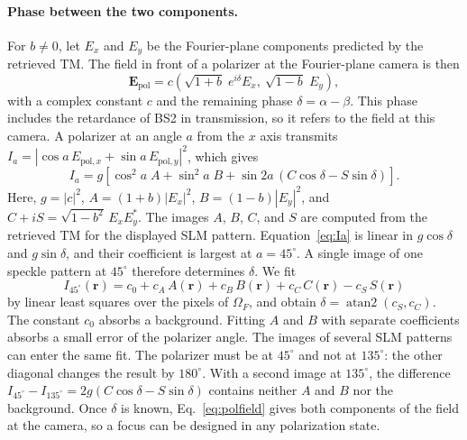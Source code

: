 \documentclass{article}
\begin{document}
\paragraph{Phase between the two components.}
For $b\neq0$, let $E_x$ and $E_y$ be the Fourier-plane components predicted by the retrieved TM.
The field in front of a polarizer at the Fourier-plane camera is then
\begin{equation}
\label{eq:polfield}
\mathbf{E}_{\mathrm{pol}}=c\left(\sqrt{1+b}\;e^{i\delta}E_x,\ \sqrt{1-b}\;E_y\right),
\end{equation}
with a complex constant $c$ and the remaining phase $\delta=\alpha-\beta$.
This phase includes the retardance of BS2 in transmission, so it refers to the field at this camera.
A polarizer at an angle $a$ from the $x$ axis transmits $I_a=|\cos a\,E_{\mathrm{pol},x}+\sin a\,E_{\mathrm{pol},y}|^2$, which gives
\begin{equation}
\label{eq:Ia}
I_a=g\left[\cos^2\!a\;A+\sin^2\!a\;B+\sin2a\,\left(C\cos\delta-S\sin\delta\right)\right].
\end{equation}
Here, $g=|c|^2$, $A=(1+b)|E_x|^2$, $B=(1-b)|E_y|^2$, and $C+iS=\sqrt{1-b^2}\,E_xE_y^{*}$.
The images $A$, $B$, $C$, and $S$ are computed from the retrieved TM for the displayed SLM pattern.
Equation~\eqref{eq:Ia} is linear in $g\cos\delta$ and $g\sin\delta$, and their coefficient is largest at $a=45^\circ$.
A single image of one speckle pattern at $45^\circ$ therefore determines $\delta$.
We fit
\begin{equation}
\label{eq:phasefit}
I_{45^\circ}(\mathbf{r})=c_0+c_A\,A(\mathbf{r})+c_B\,B(\mathbf{r})+c_C\,C(\mathbf{r})-c_S\,S(\mathbf{r})
\end{equation}
by linear least squares over the pixels of $\Omega_F$, and obtain $\delta=\operatorname{atan2}(c_S,c_C)$.
The constant $c_0$ absorbs a background.
Fitting $A$ and $B$ with separate coefficients absorbs a small error of the polarizer angle.
The images of several SLM patterns can enter the same fit.
The polarizer must be at $45^\circ$ and not at $135^\circ$: the other diagonal changes the result by $180^\circ$.
With a second image at $135^\circ$, the difference $I_{45^\circ}-I_{135^\circ}=2g\left(C\cos\delta-S\sin\delta\right)$ contains neither $A$ and $B$ nor the background.
Once $\delta$ is known, Eq.~\eqref{eq:polfield} gives both components of the field at the camera, so a focus can be designed in any polarization state.
\end{document}
